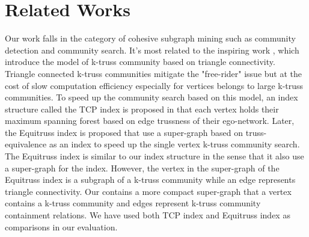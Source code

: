\section{Related Works}
\label{relatedwork} 

Our work falls in the category of cohesive subgraph mining \cite{sozio2010community,cui2014local,li2015influential,bera2018maximal} such as community detection and community search. It's most related to the inspiring work \cite{huang2014querying}, which introduce the model of k-truss community based on triangle connectivity. Triangle connected k-truss communities mitigate the "free-rider" issue but at the cost of slow computation efficiency especially for vertices belongs to large k-truss communities. To speed up the community search based on this model, an index structure called the TCP index is proposed in \cite{huang2014querying} that each vertex holds their maximum spanning forest based on edge trussness of their ego-network. 
Later, the Equitruss index \cite{akbas2017truss} is proposed that use a super-graph based on truss-equivalence as an index to speed up the single vertex k-truss community search.  
The Equitruss index is similar to our index structure in the sense that it also use a super-graph for the index. However, the vertex in the super-graph of the Equitruss index is a subgraph of a k-truss community while an edge represents triangle connectivity. Our \twolevelindex{} contains a more compact super-graph that a vertex contains a k-truss community and edges represent k-truss community containment relations. We have used both TCP index and Equitruss index as comparisons in our evaluation.

 

